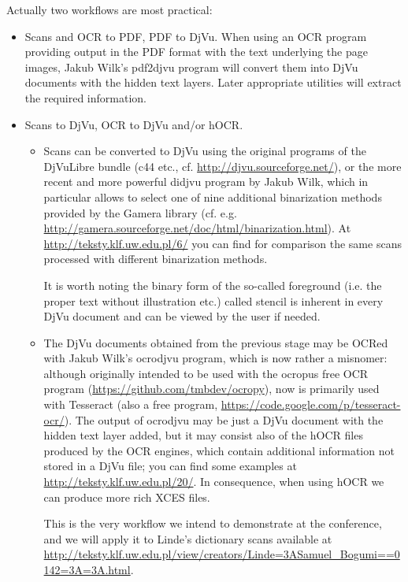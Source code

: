\documentclass{article}
\begin{document}
\bigskip
Actually two workflows are most practical:
\begin{itemize}
\item Scans and OCR to PDF, PDF to DjVu.  When using an OCR program
  providing output in the PDF format with the text underlying the page
  images, Jakub Wilk's pdf2djvu program will convert them into DjVu
  documents with the hidden text layers. Later appropriate utilities
  will extract the required information.
\item Scans to DjVu, OCR to DjVu and/or hOCR. 
  \begin{itemize}
  \item Scans can be converted to DjVu using the original programs of
    the DjVuLibre bundle (c44 etc.,
    cf. \url{http://djvu.sourceforge.net/}), or the  more recent and more
    powerful didjvu  program by Jakub Wilk, which in particular allows
    to select one of nine additional binarization methods provided by the
    Gamera library
    (cf. e.g. \url{http://gamera.sourceforge.net/doc/html/binarization.html}). At
    \url{http://teksty.klf.uw.edu.pl/6/} you can find for comparison
    the same scans processed with different binarization methods.

    It is worth noting the binary form of the so-called foreground
    (i.e. the proper text without illustration etc.) called stencil is
    inherent in every DjVu document and can be viewed by the user if
    needed.

  \item The DjVu documents obtained from the previous stage may be
    OCRed with Jakub Wilk's ocrodjvu program, which is now
    rather a misnomer: although originally intended to be used with
    the ocropus free OCR program
    (\url{https://github.com/tmbdev/ocropy}), now is primarily used
    with Tesseract (also a free program,
    \url{https://code.google.com/p/tesseract-ocr/}). The output of
    ocrodjvu may be just a DjVu document with the hidden text layer
    added, but it may consist also of the hOCR files produced by the
    OCR engines, which contain additional information not stored in a
    DjVu file; you can find some examples at
    \url{http://teksty.klf.uw.edu.pl/20/}. In consequence, when using
    hOCR we can produce more rich XCES files.

    This is the very workflow we intend to demonstrate at the
    conference, and we will apply it to Linde's dictionary scans
    available at
    \url{http://teksty.klf.uw.edu.pl/view/creators/Linde=3ASamuel_Bogumi==0142=3A=3A.html}.

  \end{itemize}

\end{itemize}
\end{document}
